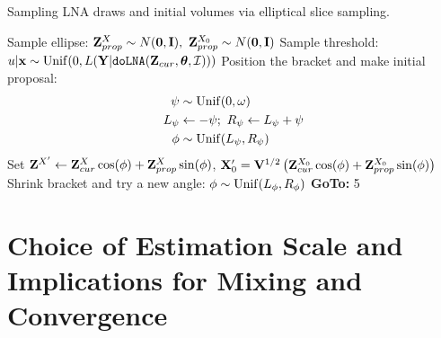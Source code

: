 \begin{algorithm}[htbp]
	\caption{Sampling LNA draws and initial volumes via elliptical slice sampling.}
	\label{alg:elliptss_lna_initvols}
	\begin{algorithmic}[1]
		\State Sample ellipse: $ \mathbf{Z}^X_{prop} \sim N(\boldsymbol{0}, \mathbf{I}),\ \mathbf{Z}^{X_0}_{prop} \sim N(\boldsymbol{0}, \mathbf{I})$
		\State Sample threshold: $ u|\mathbf{x} \sim \mathrm{Unif}(0, L(\mathbf{Y}|\texttt{doLNA}(\mathbf{Z}_{cur},\boldsymbol{\theta},\mathcal{I}))) $
		\State Position the bracket and make initial proposal: \vspace{-0.1in}
		\begin{align*}
		\psi &\sim \mathrm{Unif}(0,\omega)\\
		L_\psi &\leftarrow -\psi;\ R_\psi \leftarrow L_\psi + \psi\\
		\phi &\sim \mathrm{Unif}(L_\psi,R_\psi)
		\end{align*}
		\State Set $ \mathbf{Z}^{X'} \leftarrow \mathbf{Z}^X_{cur}\cos(\phi) + \mathbf{Z}^X_{prop}\sin(\phi) $, $ \mathbf{X}_0^\prime = \mathbf{V}^{1/2}\left (\mathbf{Z}^{X_0}_{cur}\cos(\phi) + \mathbf{Z}^{X_0}_{prop}\sin(\phi)\right ) $ 
		\State{}
		\Else
		\State Shrink bracket and try a new angle:
		\State $ \phi \sim \mathrm{Unif}(L_\phi, R_\phi) $
		\State \textbf{GoTo:} 5
		\EndIf
		\EndProcedure
	\end{algorithmic}
\end{algorithm}

\section{Choice of Estimation Scale and Implications for Mixing and Convergence}
\label{sec:est_scale_discussion}

